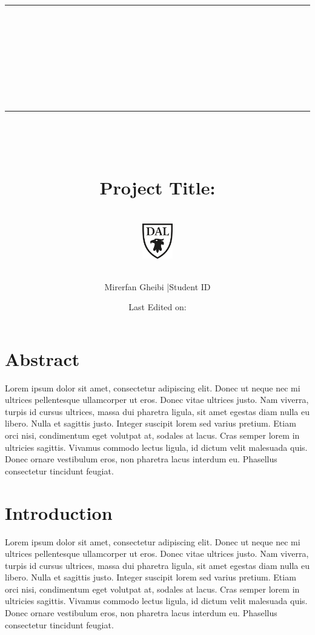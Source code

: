 \documentclass[11pt,titlepage]{article}
\title{\normalsize\rule{\textwidth}{0.1cm}\\ [0.5cm]
		\LARGE \textbf{\course}\\\reportname
		\\[0.5cm]\rule{\textwidth}{0.1cm}~\\[0.5cm]
		~
		\\\textbf{Project Title: }
		\\\prtitle
		\\ [0.5cm]
		\normalsize \vspace*{5\baselineskip}
		\includegraphics[width=0.1\textwidth]{graphics/institute_logo.png}\\[1cm]
		\author{Mirerfan Gheibi |Student ID}
		\date{Last Edited on: \laseditdate}
		}
\begin{document}
\maketitle
\newpage

\section*{Abstract}
Lorem ipsum dolor sit amet, consectetur adipiscing elit. Donec ut neque nec mi ultrices pellentesque ullamcorper ut eros. Donec vitae ultrices justo. Nam viverra, turpis id cursus ultrices, massa dui pharetra ligula, sit amet egestas diam nulla eu libero. Nulla et sagittis justo. Integer suscipit lorem sed varius pretium. Etiam orci nisi, condimentum eget volutpat at, sodales at lacus. Cras semper lorem in ultricies sagittis. Vivamus commodo lectus ligula, id dictum velit malesuada quis. Donec ornare vestibulum eros, non pharetra lacus interdum eu. Phasellus consectetur tincidunt feugiat.

\section{Introduction}
Lorem ipsum dolor sit amet, consectetur adipiscing elit. Donec ut neque nec mi ultrices pellentesque ullamcorper ut eros. Donec vitae ultrices justo. Nam viverra, turpis id cursus ultrices, massa dui pharetra ligula, sit amet egestas diam nulla eu libero. Nulla et sagittis justo. Integer suscipit lorem sed varius pretium. Etiam orci nisi, condimentum eget volutpat at, sodales at lacus. Cras semper lorem in ultricies sagittis. Vivamus commodo lectus ligula, id dictum velit malesuada quis. Donec ornare vestibulum eros, non pharetra lacus interdum eu. Phasellus consectetur tincidunt feugiat.

 

\end{document}
